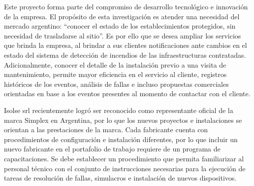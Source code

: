 Este proyecto forma parte del compromiso de desarrollo tecnológico e innovación de la empresa. El propósito de esta investigación es atender una necesidad del mercado argentino: “conocer el estado de los establecimientos protegidos, sin necesidad de trasladarse al sitio”. Es por ello que se desea ampliar los servicios que brinda la empresa, al brindar a sus clientes notificaciones ante cambios en el estado del sistema de detección de incendios de las infraestructuras contratadas. Adicionalmente, conocer el detalle de la instalación previo a una visita de mantenimiento, permite mayor eficiencia en el servicio al cliente, registros históricos de los eventos, análisis de fallas  e incluso propuestas comerciales orientadas en base a los eventos presentes al momento de contactar con el cliente.

Isolse srl recientemente logró ser reconocido como representante oficial de la marca Simplex en Argentina, por lo que los nuevos proyectos e instalaciones se orientan a las prestaciones de la marca. Cada fabricante cuenta con procedimientos de configuración e instalación diferentes, por lo que incluir un nuevo fabricante en el portafolio de trabajo requiere de un programa de capacitaciones. Se debe establecer un procedimiento que permita familiarizar al personal técnico con el conjunto de instrucciones necesarias para la ejecución de tareas de resolución de fallas, simulacros e instalación de nuevos dispositivos. 
